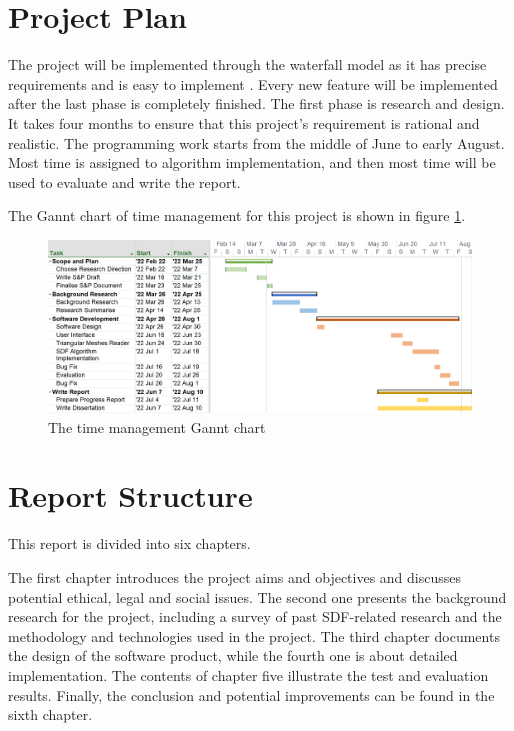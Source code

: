 \clearpage

\section{Project Plan}

The project will be implemented through the waterfall model as it has precise requirements and is easy to implement \cite{balaji2012waterfall}. Every new feature will be implemented after the last phase is completely finished. The first phase is research and design. It takes four months to ensure that this project's requirement is rational and realistic. The programming work starts from the middle of June to early August. Most time is assigned to algorithm implementation, and then most time will be used to evaluate and write the report.

\hspace*{\fill}

The Gannt chart of time management for this project is shown in figure \ref{inro:gannt}.

\begin{figure}[htbp]
    \centering
    \includegraphics[width=16cm]{Images/Chap1/Gannt.png}
    \caption{The time management Gannt chart}
    \label{inro:gannt}
\end{figure}

\section{Report Structure}
This report is divided into six chapters.

\hspace*{\fill}

The first chapter introduces the project aims and objectives and discusses potential ethical, legal and social issues. The second one presents the background research for the project, including a survey of past SDF-related research and the methodology and technologies used in the project. The third chapter documents the design of the software product, while the fourth one is about detailed implementation. The contents of chapter five illustrate the test and evaluation results. Finally, the conclusion and potential improvements can be found in the sixth chapter.

